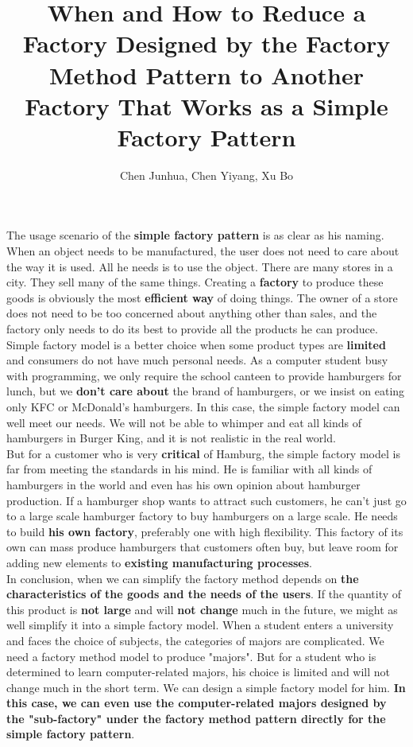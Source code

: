 \documentclass{article}
\title{When and How to Reduce a Factory Designed by the Factory Method Pattern to Another Factory That Works as a Simple Factory Pattern}
\author{Chen Junhua, Chen Yiyang, Xu Bo}
\date{}
\begin{document}
	\maketitle
	\thispagestyle{empty}
	
	The usage scenario of the \textbf{simple factory pattern} is as clear as his naming.
	When an object needs to be manufactured, the user does not need to care
	about the way it is used. All he needs is to use the object. There are many
	stores in a city. They sell many of the same things. Creating a \textbf{factory} to
	produce these goods is obviously the most \textbf{efficient way} of doing things. The
	owner of a store does not need to be too concerned about anything other
	than sales, and the factory only needs to do its best to provide all the
	products he can produce.\\
	
	Simple factory model is a better choice when some product types are \textbf{limited}
	and consumers do not have much personal needs. As a computer student
	busy with programming, we only require the school canteen to provide
	hamburgers for lunch, but we \textbf{don't care about} the brand of hamburgers,
	or we insist on eating only KFC or McDonald's hamburgers. In this case, the
	simple factory model can well meet our needs. We will not be able to whimper
	and eat all kinds of hamburgers in Burger King, and it is not realistic in the real
	world.\\
	
	But for a customer who is very \textbf{critical} of Hamburg, the simple factory model
	is far from meeting the standards in his mind. He is familiar with all kinds of
	hamburgers in the world and even has his own opinion about hamburger
	production. If a hamburger shop wants to attract such customers, he can't just
	go to a large scale hamburger factory to buy hamburgers on a large scale. He
	needs to build \textbf{his own factory}, preferably one with high flexibility. This
	factory of its own can mass produce hamburgers that customers often buy,
	but leave room for adding new elements to \textbf{existing manufacturing
processes}.\\
	
	In conclusion, when we can simplify the factory method depends on \textbf{the
characteristics of the goods and the needs of the users}. If the quantity of
	this product is \textbf{not large} and will \textbf{not change} much in the future, we might as
	well simplify it into a simple factory model. When a student enters a university
	and faces the choice of subjects, the categories of majors are complicated. We
	need a factory method model to produce "majors". But for a student who is
	determined to learn computer-related majors, his choice is limited and will not
	change much in the short term. We can design a simple factory model for him.
	\textbf{In this case, we can even use the computer-related majors designed by the
"sub-factory" under the factory method pattern directly for the simple
factory pattern}.
	
\end{document}
